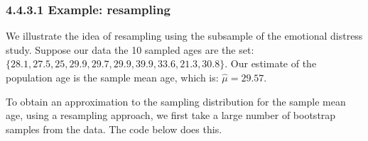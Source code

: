 \documentclass[letterpaper,10pt,english]{jupyterBook}
\begin{document}
\subsubsection{4.4.3.1 Example: resampling}
\label{\detokenize{04.e. Population.and.samples:example-resampling}}
\sphinxAtStartPar
We illustrate the idea of resampling using the sub\sphinxhyphen{}sample of the emotional distress study. Suppose our data \sphinxhyphen{} the 10 sampled ages \sphinxhyphen{} are the set: \(\{ 28.1, 27.5, 25, 29.9, 29.7, 29.9, 39.9, 33.6, 21.3, 30.8 \}\). Our estimate of the population age is the sample mean age, which is: \(\hat{\mu} = 29.57\).

\sphinxAtStartPar
To obtain an approximation to the sampling distribution for the sample mean age, using a resampling approach, we first take a large number of bootstrap samples from the data. The code below does this.

\begin{sphinxVerbatim}[commandchars=\\\{\}]
  

       

\PYG{p}{[}\PYG{p}{]}
\PYG{p}{[}\PYG{p}{]}
\PYG{p}{[}\PYG{p}{]}
\end{sphinxVerbatim}
\end{document}
